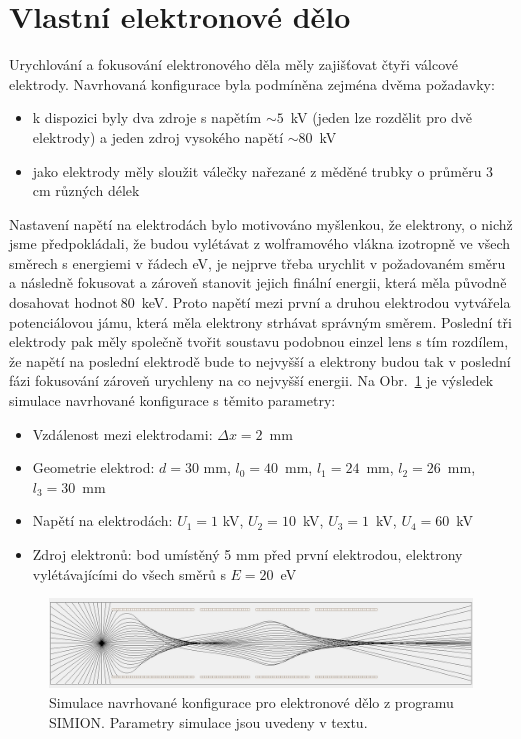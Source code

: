 \section{Vlastní elektronové dělo}

Urychlování a fokusování elektronového děla měly zajišťovat čtyři válcové elektrody. Navrhovaná konfigurace byla podmíněna zejména dvěma požadavky:
\begin{itemize}
	\item k dispozici byly dva zdroje s napětím $\sim 5$~kV (jeden lze rozdělit pro dvě elektrody) a jeden zdroj vysokého napětí $\sim 80$~kV
	\item jako elektrody měly sloužit válečky nařezané z měděné trubky o průměru 3 cm různých délek
\end{itemize}

Nastavení napětí na elektrodách bylo motivováno myšlenkou, že elektrony, o nichž jsme předpokládali, že budou vylétávat z wolframového vlákna izotropně ve všech směrech s energiemi v řádech eV, je nejprve třeba urychlit v požadovaném směru a následně fokusovat a zároveň stanovit jejich finální energii, která měla původně dosahovat hodnot$~80$~keV. Proto napětí mezi první a druhou elektrodou vytvářela potenciálovou jámu, která měla elektrony strhávat správným směrem. Poslední tři elektrody pak měly společně tvořit soustavu podobnou einzel lens s tím rozdílem, že napětí na poslední elektrodě bude to nejvyšší a elektrony budou tak v poslední fázi fokusování zároveň urychleny na co nejvyšší energii. Na Obr.~\ref{05simulaceVlastniDelo} je výsledek simulace navrhované konfigurace s těmito parametry:
\begin{itemize}
	\item Vzdálenost mezi elektrodami: $\Delta x = 2$~mm
	\item Geometrie elektrod: $d = 30$ mm, $l_0 = 40$~mm, $l_1 = 24$~mm, $l_2 = 26$~mm, $l_3 = 30$~mm
	\item Napětí na elektrodách: $U_1 = 1$ kV, $U_2 = 10$~kV, $U_3 = 1$~kV, $U_4 = 60$~kV
	\item Zdroj elektronů: bod umístěný 5 mm před první elektrodou, elektrony vylétávajícími do všech směrů s $E = 20$~eV
\end{itemize}

\begin{figure}[htbp!]
\centering
\includegraphics[width = 366 pt]{Figure/05/2a.jpg}
\caption[Simulace navrhované konfigurace pro elektronové dělo z programu SIMION.]{Simulace navrhované konfigurace pro elektronové dělo z programu SIMION. Parametry simulace jsou uvedeny v textu.}
\label{05simulaceVlastniDelo}
\end{figure}

